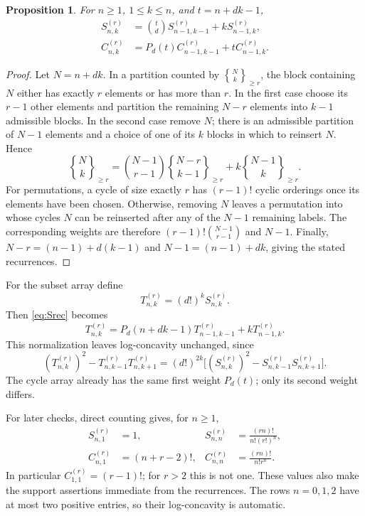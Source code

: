 \documentclass[11pt,a4paper]{article}
\numberwithin{equation}{section}
\newtheorem{proposition}[proposition]{Proposition}
\theoremstyle{definition}
\theoremstyle{remark}
\newcommand{\Snum}[3]{S^{(#1)}_{#2,#3}}
\newcommand{\Cnum}[3]{C^{(#1)}_{#2,#3}}
\newcommand{\assocS}[3]{\genfrac\{\}{0pt}{}{#1}{#2}_{\!\ge #3}}
\begin{document}
\begin{proposition}\label{prop:recurrences}
For $n\ge1$, $1\le k\le n$, and $t=n+dk-1$,
\begin{align}
 \Snum r n k
   &=\binom{t}{d}\Snum r {n-1}{k-1}+k\Snum r {n-1}k,
       \label{eq:Srec}\\
 \Cnum r n k
   &=P_d(t)\Cnum r {n-1}{k-1}+t\Cnum r {n-1}k.
       \label{eq:Crec}
\end{align}
\end{proposition}
\begin{proof}
Let $N=n+dk$. In a partition counted by $\assocS Nk r$, the block
containing $N$ either has exactly $r$ elements or has more than $r$.
In the first case choose its $r-1$ other elements and partition the remaining
$N-r$ elements into $k-1$ admissible blocks. In the second case remove $N$;
there is an admissible partition of $N-1$ elements and a choice of one of its
$k$ blocks in which to reinsert $N$. Hence
\[
 \assocS Nk r=\binom{N-1}{r-1}\assocS{N-r}{k-1}r
                 +k\assocS{N-1}kr.
\]
For permutations, a cycle of size exactly $r$ has $(r-1)!$ cyclic
orderings once its elements have been chosen. Otherwise, removing $N$
leaves a permutation into whose cycles $N$ can be reinserted after any
of the $N-1$ remaining labels. The corresponding weights are therefore
$(r-1)!\binom{N-1}{r-1}$ and $N-1$.
Finally,
$N-r=(n-1)+d(k-1)$ and $N-1=(n-1)+dk$, giving the stated recurrences.
\end{proof}

For the subset array define
\begin{equation}\label{eq:normalization}
 T^{(r)}_{n,k}=(d!)^k\Snum r n k.
\end{equation}
Then \eqref{eq:Srec} becomes
\begin{equation}\label{eq:Trec}
 T^{(r)}_{n,k}=P_d(n+dk-1)T^{(r)}_{n-1,k-1}
                      +kT^{(r)}_{n-1,k}.
\end{equation}
This normalization leaves log-concavity unchanged, since
\begin{equation}\label{eq:scale-difference}
 (T^{(r)}_{n,k})^2-T^{(r)}_{n,k-1}T^{(r)}_{n,k+1}
  =(d!)^{2k}\bigl[(\Snum r n k)^2-\Snum r n{k-1}\Snum r n{k+1}\bigr].
\end{equation}
The cycle array already has the same first weight $P_d(t)$; only its
second weight differs.

For later checks, direct counting gives, for $n\ge1$,
\begin{align}
 \Snum r n1&=1,&
 \Snum r nn&=\frac{(rn)!}{n!(r!)^n},\label{eq:Sboundary}\\
 \Cnum r n1&=(n+r-2)!,&
 \Cnum r nn&=\frac{(rn)!}{n!r^n}.\label{eq:Cboundary}
\end{align}
In particular $C^{(r)}_{1,1}=(r-1)!$; for $r>2$ this is not one.
These values also make the support assertions immediate from the recurrences.
The rows $n=0,1,2$ have at most two positive entries, so their
log-concavity is automatic.
\end{document}
